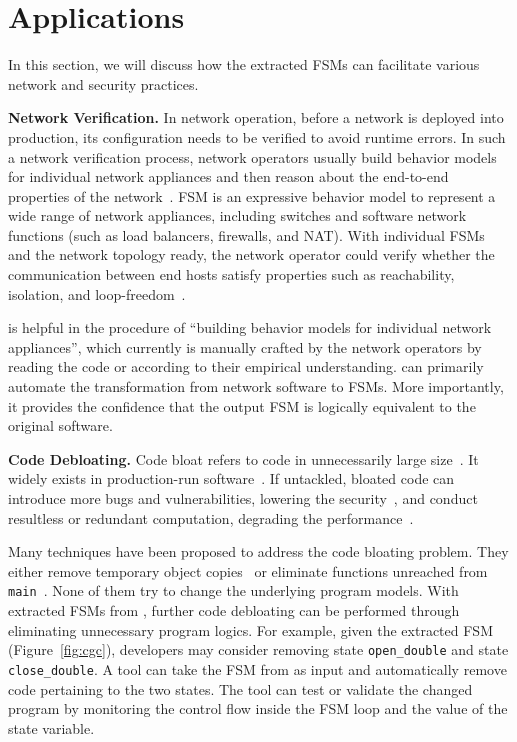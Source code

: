 
\section{Applications}
\label{sec:app}

In this section, we will discuss how the extracted FSMs can facilitate 
various network and security practices.  


\noindent\textbf{Network Verification.}  In network operation, before a network 
is deployed into production, its configuration needs to be verified to avoid 
runtime errors. In such a network verification process, network operators 
usually build behavior models for individual network appliances and then 
reason about the end-to-end properties of the 
network~\cite{mai2011debugging,khurshid2013veriflow,kazemian2012header,kazemian2013real,fayaz2016buzz,panda2017verifying}. 
FSM is an expressive 
behavior model to represent a wide range of network appliances, including 
switches and software network functions (such as load balancers, firewalls, 
and NAT). With individual FSMs and the network topology ready, the network 
operator could verify whether the communication between end hosts satisfy 
properties such as reachability, isolation, and loop-freedom~\cite{xxx}.

\Tool{} is helpful in the procedure of ``building behavior models for 
individual network appliances'', which currently is manually crafted by 
the network operators by reading the code or according to their 
empirical understanding. \Tool{} can primarily automate the 
transformation from network software to FSMs. More importantly, it 
provides the confidence that the output FSM is logically equivalent 
to the original software.


\noindent\textbf{Code Debloating.}
Code bloat refers to code in unnecessarily large size~\cite{code-bloat}.
It widely exists in production-run software~\cite{code-bloat-study}. 
If untackled, bloated code can introduce more bugs and vulnerabilities, 
lowering the security~\cite{protocol-mao}, 
and conduct resultless or redundant computation, 
degrading the performance~\cite{BloatFSE2008,XuBloatPLDI2009,XuBloatPLDI2010}. 

Many techniques have been proposed to address the code bloating problem. 
They either remove temporary object copies~\cite{BloatFSE2008,XuBloatPLDI2009,
XuBloatPLDI2010,Reusable,Cachetor} 
or eliminate functions unreached from 
\texttt{main}~\cite{container-debloating-1, 
container-debloating-2, dinghao-1}. 
None of them try to change the underlying program models.
With extracted FSMs from \Tool{}, 
further code debloating can be performed through
eliminating unnecessary program logics. 
For example, given the extracted FSM (Figure~\ref{fig:cgc}), 
developers may consider removing state \texttt{open\_double} and 
state \texttt{close\_double}. 
A tool can take the FSM from \Tool{} as input and automatically 
remove code pertaining to the two states. 
The tool can test or validate the changed program 
by monitoring the control flow 
inside the FSM loop and the value of the state variable.

